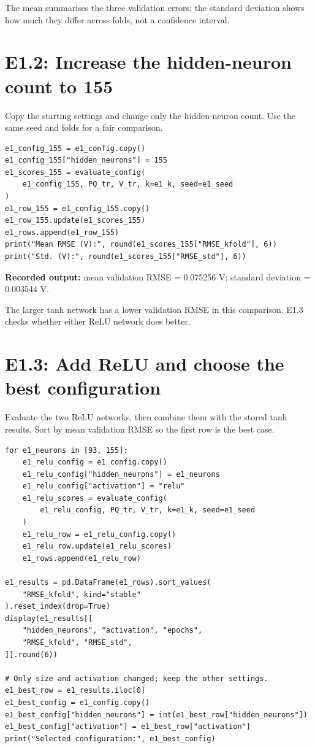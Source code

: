 \documentclass[11pt,a4paper]{article}
\begin{document}
The mean summarises the three validation errors; the standard deviation
shows how much they differ across folds, not a confidence interval.

\clearpage
\section*{E1.2: Increase the hidden-neuron count to 155}
Copy the starting settings and change only the hidden-neuron count. Use
the same seed and folds for a fair comparison.

\begin{lstlisting}
e1_config_155 = e1_config.copy()
e1_config_155["hidden_neurons"] = 155
e1_scores_155 = evaluate_config(
    e1_config_155, PQ_tr, V_tr, k=e1_k, seed=e1_seed
)
e1_row_155 = e1_config_155.copy()
e1_row_155.update(e1_scores_155)
e1_rows.append(e1_row_155)
print("Mean RMSE (V):", round(e1_scores_155["RMSE_kfold"], 6))
print("Std. (V):", round(e1_scores_155["RMSE_std"], 6))
\end{lstlisting}

\textbf{Recorded output:} mean validation RMSE = 0.075256 V;
standard deviation = 0.003544 V.

The larger tanh network has a lower validation RMSE in this comparison.
E1.3 checks whether either ReLU network does better.

\clearpage
\section*{E1.3: Add ReLU and choose the best configuration}
Evaluate the two ReLU networks, then combine them with the stored tanh
results. Sort by mean validation RMSE so the first row is the best case.

\begin{lstlisting}
for e1_neurons in [93, 155]:
    e1_relu_config = e1_config.copy()
    e1_relu_config["hidden_neurons"] = e1_neurons
    e1_relu_config["activation"] = "relu"
    e1_relu_scores = evaluate_config(
        e1_relu_config, PQ_tr, V_tr, k=e1_k, seed=e1_seed
    )
    e1_relu_row = e1_relu_config.copy()
    e1_relu_row.update(e1_relu_scores)
    e1_rows.append(e1_relu_row)

e1_results = pd.DataFrame(e1_rows).sort_values(
    "RMSE_kfold", kind="stable"
).reset_index(drop=True)
display(e1_results[[
    "hidden_neurons", "activation", "epochs",
    "RMSE_kfold", "RMSE_std",
]].round(6))

# Only size and activation changed; keep the other settings.
e1_best_row = e1_results.iloc[0]
e1_best_config = e1_config.copy()
e1_best_config["hidden_neurons"] = int(e1_best_row["hidden_neurons"])
e1_best_config["activation"] = e1_best_row["activation"]
print("Selected configuration:", e1_best_config)
\end{lstlisting}
\end{document}
